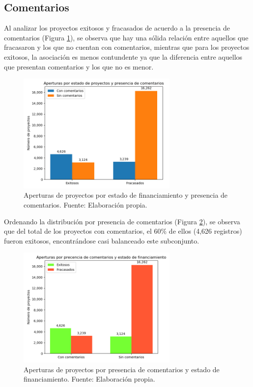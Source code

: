 \subsection{Comentarios}
Al analizar los proyectos exitosos y fracasados de acuerdo a la presencia de comentarios (Figura \ref{4:fig26}), se observa que hay una sólida relación entre aquellos que fracasaron y los que no cuentan con comentarios, mientras que para los proyectos exitosos, la asociación es menos contundente ya que la diferencia entre aquellos que presentan comentarios y los que no es menor.

\begin{figure}[!ht]
	\begin{center}
		\includegraphics[width=0.7\textwidth]{4/figures/projects state by comment.png}
		\caption{Aperturas de proyectos por estado de financiamiento y presencia de comentarios. Fuente: Elaboración propia.}
		\label{4:fig26}
	\end{center}
\end{figure}

Ordenando la distribución por presencia de comentarios (Figura \ref{4:fig27}), se observa que del total de los proyectos con comentarios, el 60\% de ellos (4,626 registros) fueron exitosos, encontrándose casi balanceado este subconjunto.

\begin{figure}[!ht]
	\begin{center}
		\includegraphics[width=0.7\textwidth]{4/figures/projects comment by state.png}
		\caption{Aperturas de proyectos por presencia de comentarios y estado de financiamiento. Fuente: Elaboración propia.}
		\label{4:fig27}
	\end{center}
\end{figure}

